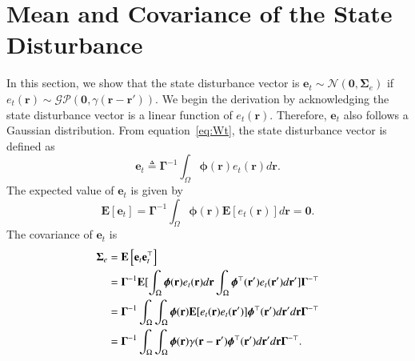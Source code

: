 \documentclass[5p,authoryear]{elsarticle}
\begin{document}
\section{Mean and Covariance of the State Disturbance }\label{App:ColoredNoise} 
In this section, we show that the state disturbance vector is $\mathbf{e}_t\sim\mathcal{N}(\mathbf 0,\boldsymbol\Sigma_e)$ if $e_t(\mathbf{r})\sim\mathcal{GP}\left(\mathbf 0,\gamma(\mathbf{r}-\mathbf{r}')\right)$. We begin the derivation by acknowledging the state disturbance vector is a linear function of $e_t(\mathbf r)$. Therefore, $\mathbf{e}_t$ also follows a Gaussian distribution. From equation~\ref{eq:Wt}, the state disturbance vector is defined as
\begin{equation}
	\mathbf{e}_t \triangleq \boldsymbol{\Gamma}^{-1}\int_\Omega {\boldsymbol{\phi} ( \mathbf{r} )e_t( \mathbf{r} )d\mathbf{r}}.
\end{equation}
The expected value of $\mathbf e_t$ is given by 
\begin{equation}
	\mathbf E\left[ \mathbf e_t\right]= \mathbf{\Gamma}^{-1}\int_{\Omega}\boldsymbol\phi\left(\mathbf{r}\right)\mathbf E\left[e_t\left(\mathbf{r}\right)\right] d\mathbf{r}=\mathbf 0.
\end{equation}
The covariance of $\mathbf{e}_t$ is 
\begin{align}
	\boldsymbol\Sigma_e &=\lefteqn{\mathbf E\left[ \mathbf e_t\mathbf e_t^\top\right]} \nonumber \\ 
&=\mathbf{\Gamma}^{-1}\mathbf E[\int_{\Omega}\boldsymbol{\phi}(\mathbf{r})e_t(\mathbf{r})d\mathbf{r} \int_{\Omega}\boldsymbol{\phi}^{\top}(\mathbf{r}') e_t(\mathbf{r}')d\mathbf{r}']\mathbf{\Gamma}^{- \top} \nonumber \\
	&=\mathbf{\Gamma}^{-1}\int_{\Omega}\int_{\Omega} \boldsymbol{\phi}(\mathbf{r}) \mathbf E[e_t(\mathbf{r})e_t(\mathbf{r}')]\boldsymbol{\phi}^{\top}(\mathbf{r}')d\mathbf{r}' d\mathbf r\mathbf{\Gamma}^{- \top} \nonumber\\
	&=\mathbf{\Gamma}^{-1}\int_{\Omega}\int_{\Omega}\boldsymbol{\phi}(\mathbf r) \gamma(\mathbf r- \mathbf r' )\boldsymbol{\phi}^{\top}(\mathbf r')d\mathbf r' d\mathbf r\mathbf{\Gamma}^{-\top}.
\end{align}
\end{document}
